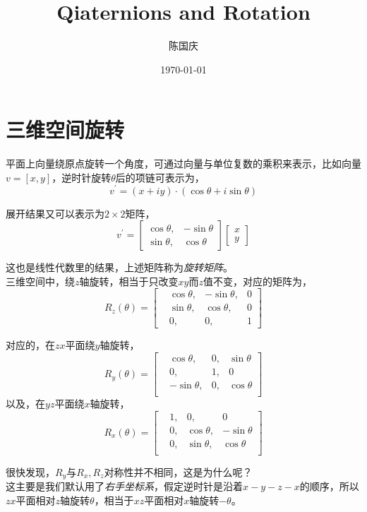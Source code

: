 \documentclass[hpyerref,UTF8,a4paper,titlepage,12pt,oneside]{ctexbook}
\title{Qiaternions and Rotation}
\author{陈国庆}
\date{\today}
\theoremstyle{definition}
\begin{document}
\maketitle
\tableofcontents

\section{三维空间旋转}

平面上向量绕原点旋转一个角度，可通过向量与单位复数的乘积来表示，比如向量$v= [x,y]$，逆时针旋转$\theta$后的项链可表示为，
$$
	v^\prime = (x + iy)\cdot (\cos \theta + i\sin\theta)
$$

展开结果又可以表示为$2\times 2$矩阵，
$$
	v^\prime = \begin{bmatrix}
		\cos\theta,& -\sin\theta\\
		\sin\theta,& \cos\theta
	\end{bmatrix}
	\begin{bmatrix}
		x\\
		y
	\end{bmatrix}
$$

这也是线性代数里的结果，上述矩阵称为\textit{旋转矩阵}。\\

三维空间中，绕$z$轴旋转，相当于只改变$xy$而$z$值不变，对应的矩阵为，
$$
	R_z(\theta) = \begin{bmatrix}
			&\cos\theta,&-\sin\theta, & 0\\
			&\sin\theta,&\cos\theta, &0\\
			&0,&0,&1
		\end{bmatrix}
$$

对应的，在$zx$平面绕$y$轴旋转，
$$
	R_y(\theta) = \begin{bmatrix}
			&\cos\theta,&0, &\sin\theta\\
			&0, &1,&0\\
			&-\sin\theta,&0,&\cos\theta\\
		\end{bmatrix}
$$
以及，在$yz$平面绕$x$轴旋转，
$$
	R_x(\theta) = \begin{bmatrix}
			&1,	&0,			&0\\
			&0, &\cos\theta,&-\sin\theta\\
			&0,	&\sin\theta,&\cos\theta\\
		\end{bmatrix}
$$
 
很快发现，$R_y$与$R_x,R_z$对称性并不相同，这是为什么呢？\\

这主要是我们默认用了\textit{右手坐标系}，假定逆时针是沿着$x-y-z-x$的顺序，所以$zx$平面相对$z$轴旋转$\theta$，相当于$xz$平面相对$x$轴旋转$-\theta$。
\end{document}
